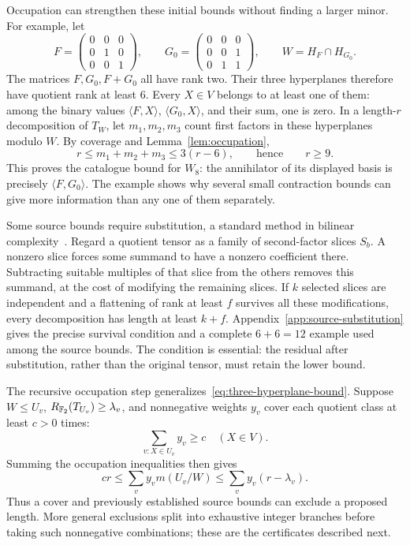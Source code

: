 Occupation can strengthen these initial bounds without finding a
larger minor. For example, let
\begin{equation}\label{eq:source-example}
 F=\begin{pmatrix}0&0&0\\0&1&0\\0&0&1\end{pmatrix},\qquad
 G_0=\begin{pmatrix}0&0&0\\0&0&1\\0&1&1\end{pmatrix},\qquad
 W=H_F\cap H_{G_0}.
\end{equation}
The matrices $F,G_0,F+G_0$ all have rank two. Their three
hyperplanes therefore have quotient rank at least $6$. Every $X\in V$
belongs to at least one of them: among the binary values
$\langle F,X\rangle$, $\langle G_0,X\rangle$, and their sum,
one is zero. In a length-$r$ decomposition of $T_W$, let $m_1,m_2,m_3$
count first factors in these hyperplanes modulo $W$. By coverage and
Lemma~\ref{lem:occupation},
\begin{equation}\label{eq:three-hyperplane-bound}
 r\leq m_1+m_2+m_3\leq3(r-6),
 \qquad\text{hence}\qquad r\geq9.
\end{equation}
This proves the catalogue bound for $W_8$: the annihilator of its
displayed basis is precisely $\langle F,G_0\rangle$. The example
shows why several small contraction bounds can give more information
than any one of them separately.

Some source bounds require substitution, a standard method in
bilinear complexity~\cite{blaser}. Regard a quotient tensor
as a family of second-factor slices $S_b$. A nonzero slice forces
some summand to have a nonzero coefficient there. Subtracting suitable
multiples of that slice from the others removes this summand, at the
cost of modifying the remaining slices. If $k$ selected slices are
independent and a flattening of rank at least $f$ survives all these
modifications, every decomposition has length at least $k+f$.
Appendix~\ref{app:source-substitution} gives the precise survival
condition and a complete $6+6=12$ example used among the source
bounds. The condition is essential: the residual after substitution,
rather than the original tensor, must retain the lower bound.

The recursive occupation step generalizes~\eqref{eq:three-hyperplane-bound}.
Suppose $W\leq U_v$, $R_{\mathbb F_2}(T_{U_v})\geq\lambda_v$, and
nonnegative weights $y_v$ cover each quotient class at least $c>0$
times:
\begin{equation}\label{eq:weighted-cover}
 \sum_{v:X\in U_v}y_v\geq c\quad(X\in V).
\end{equation}
Summing the occupation inequalities then gives
\begin{equation}\label{eq:weighted-bound}
 cr\leq\sum_v y_v m(U_v/W)
       \leq\sum_v y_v(r-\lambda_v).
\end{equation}
Thus a cover and previously established source bounds can exclude a
proposed length. More general exclusions split into exhaustive integer
branches before taking such nonnegative combinations; these are the
certificates described next.


